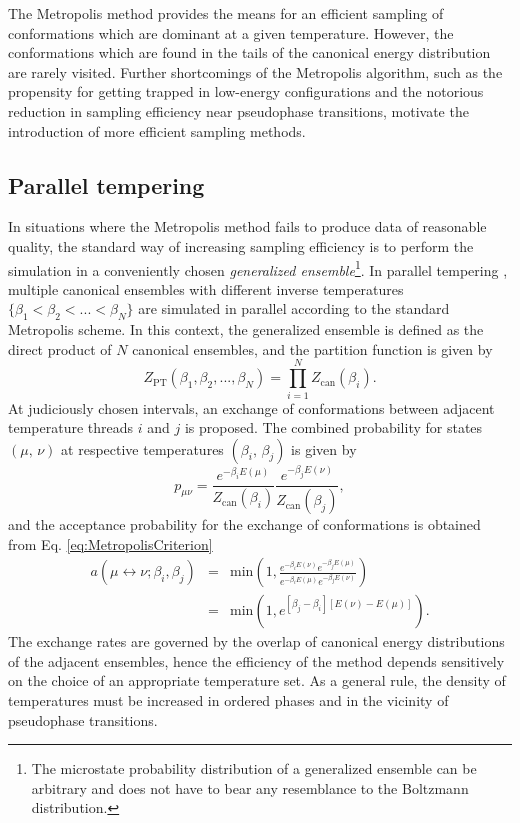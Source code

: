 \documentclass[12pt]{report}
\begin{document}
The Metropolis method provides the means for an efficient sampling of conformations which are dominant at a given temperature. However, the conformations which are found in the tails of the canonical energy distribution are rarely visited. Further shortcomings of the Metropolis algorithm, such as the propensity for getting trapped in low-energy configurations and the notorious reduction in sampling efficiency near pseudophase transitions, motivate the introduction of more efficient sampling methods.


\subsection{Parallel tempering}
\label{subsec:ParallelTempering}
In situations where the Metropolis method fails to produce data of reasonable quality, the standard way of increasing sampling efficiency is to perform the simulation in a conveniently chosen \textit{generalized ensemble}\footnote{The microstate probability distribution of a generalized ensemble can be arbitrary and does not have to bear any resemblance to the Boltzmann distribution.}. In parallel tempering \cite{sw1,geyer1,huku1,huku2}, multiple canonical ensembles with different inverse temperatures $\{\beta_{1} < \beta_{2} < ... < \beta_{N}\}$ are simulated in parallel according to the standard Metropolis scheme. In this context, the generalized ensemble is defined as the direct product of $N$ canonical ensembles, and the partition function is given by
%
\begin{equation}
Z_{\mathrm{PT}}(\beta_{1},\beta_{2},...,\beta_{N}) = \prod_{i=1}^{N} Z_{\mathrm{can}}(\beta_{i}).
\end{equation}
%
At judiciously chosen intervals, an exchange of conformations between adjacent temperature threads $i$ and $j$ is proposed. The combined probability for states $(\mu, \, \nu)$ at respective temperatures $(\beta_{i}, \, \beta_{j})$ is given by
\begin{equation}
p_{\mu\nu} =  \frac{\displaystyle e^{-\beta_{i}E(\mu)}}{\displaystyle Z_{\mathrm{can}}(\beta_{i})} \frac{\displaystyle e^{-\beta_{j}E(\nu)}}{\displaystyle Z_{\mathrm{can}}(\beta_{j})},
\end{equation}
%
and the acceptance probability for the exchange of conformations is obtained from Eq. \ref{eq:MetropolisCriterion}
%
\begin{eqnarray}
\label{eq:replicaExchange}
a\left(\mu \leftrightarrow \nu;\beta _{i}, \beta_{j} \right) &=&
\mathrm{min}\left(1, \frac{\displaystyle e^{-\beta_{i}E(\nu)}e^{-\beta_{j}E(\mu)}}{\displaystyle e^{-\beta_{i}E(\mu)}e^{-\beta_{j}E(\nu)}}\right) \nonumber \\
&=&
\mathrm{min}\left(1,e^{\left[\beta_{j} -
\beta _{i} \right] \left[E (\nu) -
E(\mu)\right]} \right).
\end{eqnarray}
%
The exchange rates are governed by the overlap of canonical energy distributions of the adjacent ensembles, hence the efficiency of the method depends sensitively on the choice of an appropriate temperature set. As a general rule, the density of temperatures must be increased in ordered phases and in the vicinity of pseudophase transitions. 
\end{document}
